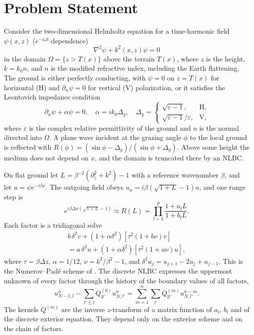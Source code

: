 \documentclass[journal]{IEEEtran}
\newcommand{\het}{\nu}
\newcommand{\pd}{\partial}
\begin{document}
\section{Problem Statement}\label{sec:problem}

Consider the two-dimensional Helmholtz equation for a time-harmonic field
$\psi(x,z)$ ($e^{-i\omega t}$ dependence)
\begin{equation}\label{eq:helmholtz}
\nabla^2\psi+k^2(x,z)\psi=0
\end{equation}
in the domain $\Omega=\{z>T(x)\}$ above the terrain $T(x)$, where $z$ is the
height, $k=k_0n$, and $n$ is the modified refractive index, including the Earth
flattening. The ground is either perfectly conducting, with $\psi=0$ on
$z=T(x)$ for horizontal (H) and $\pd_n\psi=0$ for vertical (V) polarization,
or it satisfies the Leontovich impedance condition \cite{levy2000book}
\begin{equation}\label{eq:leontovich}
\pd_n\psi+\alpha\psi=0,\quad \alpha=ik_0\Delta_g,\quad
\Delta_g=\begin{cases}\sqrt{\varepsilon-1}, & \text{H},\\ \sqrt{\varepsilon-1}/\varepsilon, & \text{V},\end{cases}
\end{equation}
where $\varepsilon$ is the complex relative permittivity of the ground and $n$
is the normal directed into $\Omega$. A plane wave incident at the grazing
angle $\phi$ to the local ground is reflected with
$R(\phi)=(\sin\phi-\Delta_g)/(\sin\phi+\Delta_g)$. Above some height the medium does not depend on $x$, and the
domain is truncated there by an NLBC.

On flat ground let $L=\beta^{-2}\left(\pd_z^2+k^2\right)-1$
with a reference wavenumber $\beta$, and let $u=\psi e^{-i\beta x}$. The
outgoing field obeys $u_x=i\beta(\sqrt{1+L}-1)u$, and one range step is
\begin{equation}\label{eq:rational}
e^{i\beta\Delta x\left(\sqrt{1+L}-1\right)}\approx R(L)=\prod_{l=1}^{p}\frac{1+a_lL}{1+b_lL}.
\end{equation}
Each factor is a tridiagonal solve
\begin{multline}\label{eq:substep_flat}
b\,\delta^2 v+(1+\alpha\delta^2)\left[\tau^2(1+b\het)v\right]\\
=a\,\delta^2 u+(1+\alpha\delta^2)\left[\tau^2(1+a\het)u\right],
\end{multline}
where $\tau=\beta\Delta z$, $\alpha=1/12$, $\het=k^2/\beta^2-1$, and
$\delta^2u_j=u_{j+1}-2u_j+u_{j-1}$. This is the Numerov--Pad\'e scheme of
\cite{lytaev2020awpl}.
The discrete NLBC \cite{lytaev2018awpl} expresses the uppermost unknown of
every factor through the history of the boundary values of all factors,
\begin{equation}\label{eq:nlbc}
u^n_{N-1,l}-\sum_{l'\le l}Q^{(0)}_{ll'}u^n_{N,l'}=\sum_{m=1}^{n}\sum_{l'}Q^{(m)}_{ll'}u^{n-m}_{N,l'}.
\end{equation}
The kernels $Q^{(m)}$ are the inverse $z$-transform of a matrix function of
$a_l$, $b_l$ and of the discrete exterior equation. They depend only on the
exterior scheme and on the chain of factors.
\end{document}
